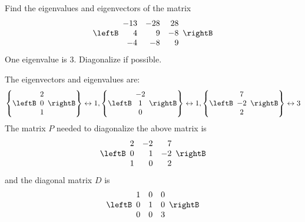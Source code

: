 \begin{enumialphparenastyle}
\begin{ex} Find the eigenvalues and eigenvectors of the matrix 
\begin{equation*}
\leftB
\begin{array}{rrr}
-13 & -28 & 28 \\
4 & 9 & -8 \\
-4 & -8 & 9
\end{array}
\rightB
\end{equation*}
One eigenvalue is $3.$ Diagonalize if possible.
\begin{sol}
The eigenvectors and eigenvalues are:
\[
\left\{ \leftB
\begin{array}{c}
2 \\
0 \\
1
\end{array}
\rightB \right\} \leftrightarrow 1, \left\{ \leftB
\begin{array}{c}
-2 \\
1 \\
0
\end{array}
\rightB \right\} \leftrightarrow 1, \left\{ \leftB
\begin{array}{c}
7 \\
-2 \\
2
\end{array}
\rightB \right\} \leftrightarrow 3
\]
The matrix $P$ needed to diagonalize the above matrix is 
\[
\leftB 
\begin{array}{rrr}
2 & -2 & 7 \\
0 & 1 & -2 \\
1 & 0 & 2 
\end{array}
\rightB
\]
and the diagonal matrix $D$ is 
\[
\leftB
\begin{array}{rrr}
1 & 0 & 0  \\
0 & 1 & 0 \\
0 & 0 & 3 
\end{array}
\rightB
\]
\end{sol}
\end{ex}


\end{enumialphparenastyle}

